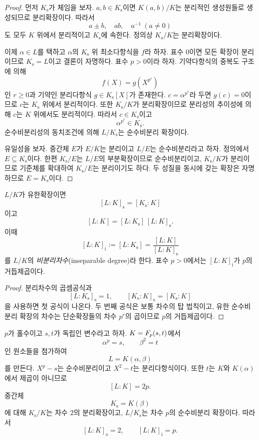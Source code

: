 \begin{proof}
먼저 $K_{\mathrm s}$가 체임을 보자. $a,b\in K_{\mathrm s}$이면 $K(a,b)/K$는 분리적인 생성원들로 생성되므로 분리확장이다. 따라서
\[
  a\pm b,\quad ab,\quad a^{-1}\ (a\ne0)
\]
도 모두 $K$ 위에서 분리적이고 $K_{\mathrm s}$에 속한다. 정의상 $K_{\mathrm s}/K$는 분리확장이다.

이제 $\alpha\in L$를 택하고 $\alpha$의 $K_{\mathrm s}$ 위 최소다항식을 $f$라 하자. 표수 $0$이면 모든 확장이 분리이므로 $K_{\mathrm s}=L$이고 결론이 자명하다. 표수 $p>0$이라 하자. 기약다항식의 중복도 구조에 의해
\[
  f(X)=g(X^{p^r})
\]
인 $r\ge0$과 기약인 분리다항식 $g\in K_{\mathrm s}[X]$가 존재한다. $c=\alpha^{p^r}$라 두면 $g(c)=0$이므로 $c$는 $K_{\mathrm s}$ 위에서 분리적이다. 또한 $K_{\mathrm s}/K$가 분리확장이므로 분리성의 추이성에 의해 $c$는 $K$ 위에서도 분리적이다. 따라서 $c\in K_{\mathrm s}$이고
\[
  \alpha^{p^r}\in K_{\mathrm s}.
\]
순수비분리성의 동치조건에 의해 $L/K_{\mathrm s}$는 순수비분리 확장이다.

유일성을 보자. 중간체 $E$가 $E/K$는 분리이고 $L/E$는 순수비분리라고 하자. 정의에서 $E\subseteq K_{\mathrm s}$이다. 한편 $K_{\mathrm s}/E$는 $L/E$의 부분확장이므로 순수비분리이고, $K_{\mathrm s}/K$가 분리이므로 기준체를 확대하여 $K_{\mathrm s}/E$는 분리이기도 하다. 두 성질을 동시에 갖는 확장은 자명하므로 $E=K_{\mathrm s}$이다.
\end{proof}

\begin{corollary}
$L/K$가 유한확장이면
\[
  [L:K]_{\mathrm s}=[K_{\mathrm s}:K]
\]
이고
\[
  [L:K]=[L:K_{\mathrm s}]\,[L:K]_{\mathrm s}.
\]
이때
\[
  [L:K]_{\mathrm i}:=[L:K_{\mathrm s}]
  =\frac{[L:K]}{[L:K]_{\mathrm s}}
\]
를 $L/K$의 \emph{비분리차수}(inseparable degree)라 한다. 표수 $p>0$에서는 $[L:K]_{\mathrm i}$가 $p$의 거듭제곱이다.
\end{corollary}

\begin{proof}
분리차수의 곱셈공식과
\[
  [L:K_{\mathrm s}]_{\mathrm s}=1,
  \qquad
  [K_{\mathrm s}:K]_{\mathrm s}=[K_{\mathrm s}:K]
\]
을 사용하면 첫 공식이 나온다. 두 번째 공식은 보통 차수의 탑 법칙이고, 유한 순수비분리 확장의 차수는 단순확장들의 차수 $p^r$의 곱이므로 $p$의 거듭제곱이다.
\end{proof}

\begin{example}
$p$가 홀수이고 $s,t$가 독립인 변수라고 하자. $K=F_p(s,t)$에서
\[
  \alpha^p=s,
  \qquad
  \beta^2=t
\]
인 원소들을 첨가하여
\[
  L=K(\alpha,\beta)
\]
를 만든다. $X^p-s$는 순수비분리이고 $X^2-t$는 분리다항식이다. 또한 $t$는 $K$와 $K(\alpha)$에서 제곱이 아니므로
\[
  [L:K]=2p.
\]
중간체
\[
  K_{\mathrm s}=K(\beta)
\]
에 대해 $K_{\mathrm s}/K$는 차수 $2$의 분리확장이고, $L/K_{\mathrm s}$는 차수 $p$의 순수비분리 확장이다. 따라서
\[
  [L:K]_{\mathrm s}=2,
  \qquad
  [L:K]_{\mathrm i}=p.
\]
\end{example}

